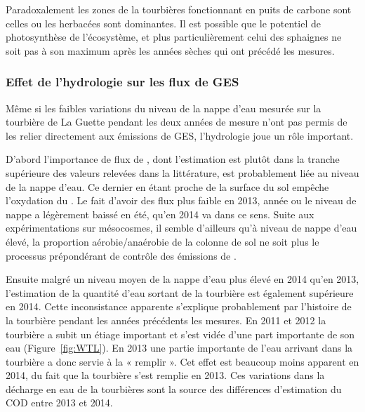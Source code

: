 Paradoxalement les zones de la tourbières fonctionnant en puits de carbone sont celles ou les herbacées sont dominantes.
Il est possible que le potentiel de photosynthèse de l'écosystème, et plus particulièrement celui des sphaignes ne soit pas à son maximum après les années sèches qui ont précédé les mesures.

\subsubsection{Effet de l'hydrologie sur les flux de GES}

Même si les faibles variations du niveau de la nappe d'eau mesurée sur la tourbière de La Guette pendant les deux années de mesure n'ont pas permis de les relier directement aux émissions de GES, l'hydrologie joue un rôle important.

D'abord l'importance de flux de \chh, dont l'estimation est plutôt dans la tranche supérieure des valeurs relevées dans la littérature, est probablement liée au niveau de la nappe d'eau.
Ce dernier en étant proche de la surface du sol empêche l'oxydation du \chh.
Le fait d'avoir des flux plus faible en 2013, année ou le niveau de nappe a légèrement baissé en été, qu'en 2014 va dans ce sens.
Suite aux expérimentations sur mésocosmes, il semble d'ailleurs qu'à niveau de nappe d'eau élevé, la proportion aérobie/anaérobie de la colonne de sol ne soit plus le processus prépondérant de contrôle des émissions de \chh.


Ensuite malgré un niveau moyen de la nappe d'eau plus élevé en 2014 qu'en 2013, l'estimation de la quantité d'eau sortant de la tourbière est également supérieure en 2014.
Cette inconsistance apparente s'explique probablement par l'histoire de la tourbière pendant les années précédents les mesures.
En 2011 et 2012 la tourbière a subit un étiage important et s'est vidée d'une part importante de son eau (Figure~\ref{fig:WTL}).
En 2013 une partie importante de l'eau arrivant dans la tourbière a donc servie à la « remplir ».
Cet effet est beaucoup moins apparent en 2014, du fait que la tourbière s'est remplie en 2013.
Ces variations dans la décharge en eau de la tourbières sont la source des différences d'estimation du COD entre 2013 et 2014.

